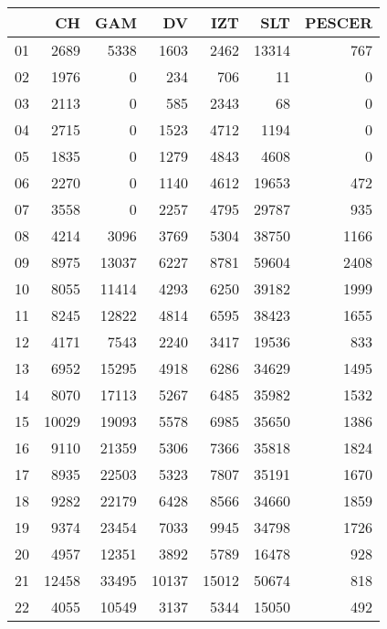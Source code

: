\begin{table}[ht]
\centering
\begin{tabular}{rrrrrrr}
  \hline
 & CH & GAM & DV & IZT & SLT & PESCER \\ 
  \hline
01 & 2689 & 5338 & 1603 & 2462 & 13314 & 767 \\ 
  02 & 1976 &   0 & 234 & 706 &  11 &   0 \\ 
  03 & 2113 &   0 & 585 & 2343 &  68 &   0 \\ 
  04 & 2715 &   0 & 1523 & 4712 & 1194 &   0 \\ 
  05 & 1835 &   0 & 1279 & 4843 & 4608 &   0 \\ 
  06 & 2270 &   0 & 1140 & 4612 & 19653 & 472 \\ 
  07 & 3558 &   0 & 2257 & 4795 & 29787 & 935 \\ 
  08 & 4214 & 3096 & 3769 & 5304 & 38750 & 1166 \\ 
  09 & 8975 & 13037 & 6227 & 8781 & 59604 & 2408 \\ 
  10 & 8055 & 11414 & 4293 & 6250 & 39182 & 1999 \\ 
  11 & 8245 & 12822 & 4814 & 6595 & 38423 & 1655 \\ 
  12 & 4171 & 7543 & 2240 & 3417 & 19536 & 833 \\ 
  13 & 6952 & 15295 & 4918 & 6286 & 34629 & 1495 \\ 
  14 & 8070 & 17113 & 5267 & 6485 & 35982 & 1532 \\ 
  15 & 10029 & 19093 & 5578 & 6985 & 35650 & 1386 \\ 
  16 & 9110 & 21359 & 5306 & 7366 & 35818 & 1824 \\ 
  17 & 8935 & 22503 & 5323 & 7807 & 35191 & 1670 \\ 
  18 & 9282 & 22179 & 6428 & 8566 & 34660 & 1859 \\ 
  19 & 9374 & 23454 & 7033 & 9945 & 34798 & 1726 \\ 
  20 & 4957 & 12351 & 3892 & 5789 & 16478 & 928 \\ 
  21 & 12458 & 33495 & 10137 & 15012 & 50674 & 818 \\ 
  22 & 4055 & 10549 & 3137 & 5344 & 15050 & 492 \\ 
   \hline
\end{tabular}
\end{table}

